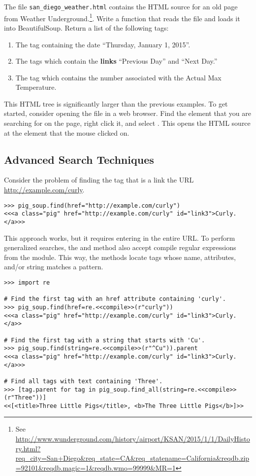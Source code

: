 \begin{problem}
The file \texttt{san\_diego\_weather.html} contains the HTML source for an old page from Weather Underground.\footnote{See \url{http://www.wunderground.com/history/airport/KSAN/2015/1/1/DailyHistory.html?req_city=San+Diego&req_state=CA&req_statename=California&reqdb.zip=92101&reqdb.magic=1&reqdb.wmo=99999&MR=1}}.
Write a function that reads the file and loads it into BeautifulSoup.
Return a list of the following tags:
\begin{enumerate}
\item The tag containing the date ``Thursday, January 1, 2015''.
\item The tags which contain the \textbf{links} ``Previous Day'' and ``Next Day.''
\item The tag which contains the number associated with the Actual Max Temperature.
\end{enumerate}

This HTML tree is significantly larger than the previous examples.
To get started, consider opening the file in a web browser.
Find the element that you are searching for on the page, right click it, and select .
This opens the HTML source at the element that the mouse clicked on.
\end{problem}

\subsection*{Advanced Search Techniques} %

Consider the problem of finding the tag that is a link the URL \url{http://example.com/curly}.

\begin{lstlisting}
>>> pig_soup.find(href="http://example.com/curly")
<<<a class="pig" href="http://example.com/curly" id="link3">Curly.</a>>>
\end{lstlisting}

This approach works, but it requires entering in the entire URL.
To perform generalized searches, the  and  method also accept compile regular expressions from the  module.
This way, the methods locate tags whose name, attributes, and/or string matches a pattern.

\begin{lstlisting}
>>> import re

# Find the first tag with an href attribute containing 'curly'.
>>> pig_soup.find(href=re.<<compile>>(r"curly"))
<<<a class="pig" href="http://example.com/curly" id="link3">Curly.</a>>

# Find the first tag with a string that starts with 'Cu'.
>>> pig_soup.find(string=re.<<compile>>(r"^Cu")).parent
<<<a class="pig" href="http://example.com/curly" id="link3">Curly.</a>>>

# Find all tags with text containing 'Three'.
>>> [tag.parent for tag in pig_soup.find_all(string=re.<<compile>>(r"Three"))]
<<[<title>Three Little Pigs</title>, <b>The Three Little Pigs</b>]>>
\end{lstlisting}

